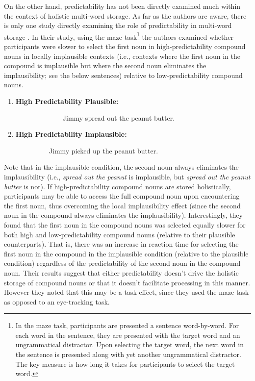 \documentclass[
  authoryear,
  preprint,
  1p,
  onecolumn]{elsarticle}
\begin{document}
On the other hand, predictability has not been directly examined much
within the context of holistic multi-word storage. As far as the authors
are aware, there is only one study directly examining the role of
predictability in multi-word storage \citep{houghton2023does}. In their
study, using the maze task\footnote{In the maze task, participants are
  presented a sentence word-by-word. For each word in the sentence, they
  are presented with the target word and an ungrammatical distractor.
  Upon selecting the target word, the next word in the sentence is
  presented along with yet another ungrammatical distractor. The key
  measure is how long it takes for participants to select the target
  word.} \citep{boyceMazeMadeEasy2020} the authors examined whether
participants were slower to select the first noun in high-predictability
compound nouns in locally implausible contexts (i.e., contexts where the
first noun in the compound is implausible but where the second noun
eliminates the implausibility; see the below sentences) relative to
low-predictability compound nouns.

\begin{enumerate}
\def\labelenumi{\arabic{enumi}.}
\item
  \begin{description}
  \item[\textbf{High Predictability Plausible:}]
  ~~~~~~~~Jimmy spread out the peanut butter.
  \end{description}
\item
  \begin{description}
  \item[\textbf{High Predictability Implausible:}]
  ~~~~Jimmy picked up the peanut butter.
  \end{description}
\end{enumerate}

\noindent Note that in the implausible condition, the second noun always
eliminates the implausibility (i.e., \emph{spread out the peanut} is
implausible, but \emph{spread out the peanut butter} is not). If
high-predictability compound nouns are stored holistically, participants
may be able to access the full compound noun upon encountering the first
noun, thus overcoming the local implausibility effect (since the second
noun in the compound always eliminates the implausibility).
Interestingly, they found that the first noun in the compound nouns was
selected equally slower for both high and low-predictability compound
nouns (relative to their plausible counterparts). That is, there was an
increase in reaction time for selecting the first noun in the compound
in the implausible condition (relative to the plausible condition)
regardless of the predictability of the second noun in the compound
noun. Their results suggest that either predictability doesn't drive the
holistic storage of compound nouns or that it doesn't facilitate
processing in this manner. However they noted that this may be a task
effect, since they used the maze task as opposed to an eye-tracking
task.
\end{document}
